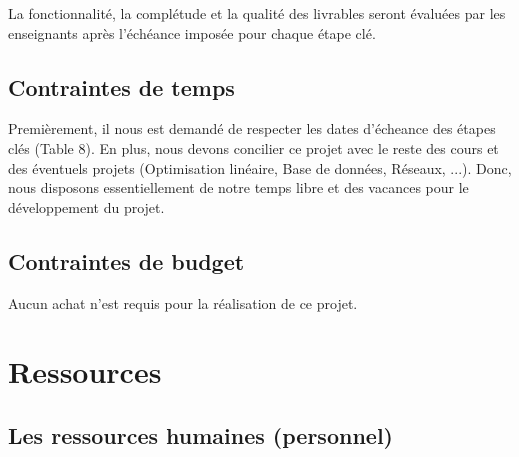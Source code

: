 \documentclass[]{article}
\newcommand{\placeholder}[1]{{\noindent \color{red}[ #1 ]}}
\begin{document}
La fonctionnalité, la complétude et la qualité des livrables seront évaluées par
les enseignants après l'échéance imposée pour chaque étape clé.

\subsection{Contraintes de temps}



Premièrement, il nous est demandé de respecter les dates d'écheance des étapes clés (Table 8). En plus, nous devons concilier ce projet avec le reste des cours et des éventuels projets (Optimisation linéaire, Base de données, Réseaux, ...). Donc, nous disposons essentiellement de notre temps libre et des vacances pour le développement du projet.

\subsection{Contraintes de budget}

Aucun achat n'est requis pour la réalisation de ce projet.

\newpage
\section{Ressources}\label{sec:organisation}

\subsection{Les ressources humaines (personnel)}

\end{document}
